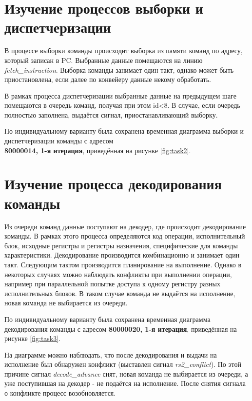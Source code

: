 \documentclass[a4paper, 14pt]{article}
\begin{document}
    \section{Изучение процессов выборки и диспетчеризации}
    В процессе выборки команды происходит выборка из памяти команд по адресу, который записан в PC. Выбранные данные помещаются на линию \textit{fetch\_instruction}.
    Выборка команды занимает один такт, однако может быть приостановлена, если далее по конвейеру данные некому обработать.

    В рамках процесса диспетчеризации выбранные данные на предыдущем шаге помещаются в очередь команд, получая при этом id<8. В случае, если очередь полностью заполнена, выдаётся сигнал, приостанавливающий выборку.

    По индивидуальному варианту была сохранена временная диаграмма выборки и диспетчеризации команды с адресом \\ \textbf{80000014, 1-я итерация}, приведённая на рисунке \ref{fig:task2}.


    \section{Изучение процесса декодирования команды}
    Из очереди команд данные поступают на декодер, где происходит декодирование команды. В рамках этого процесса определяются код операции, 
    исполнительный блок, исходные регистры и регистры назначения, специфические для команды характеристики. Декодирование производится комбинационно и занимает один такт. Следующим тактом производится планирование на выполнение.
    Однако в некоторых случаях можно наблюдать конфликты при выполнении операции, например при параллельной попытке доступа к одному регистру разных исполнительных блоков. В таком случае команда не выдаётся на исполнение, новая команда не выбирается из очереди.

    По индивидуальному варианту была сохранена временная диаграмма декодирования команды с адресом \textbf{80000020, 1-я итерация}, приведённая на рисунке \ref{fig:task3}.

    На диаграмме можно наблюдать, что после декодирования и выдачи на исполнение был обнаружен конфликт (выставлен сигнал \textit{rs2\_conflict}). По этой причине сигнал \textit{decode\_advance} снят, новая команда не выбирается из очереди, а уже поступившая на декодер - не подаётся на исполнение.
    После снятия сигнала о конфликте процесс возобновляется.
\end{document}
